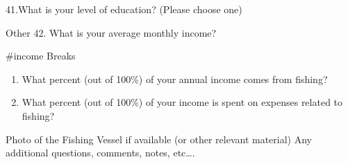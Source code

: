 \documentclass[]{article}
\begin{document}
41.What is your level of education? (Please choose one)

Other 42. What is your average monthly income?

\#income Breaks

\begin{enumerate}
\def\labelenumi{\arabic{enumi}.}
\setcounter{enumi}{42}
\item
  What percent (out of 100\%) of your annual income comes from fishing?
\item
  What percent (out of 100\%) of your income is spent on expenses
  related to fishing?
\end{enumerate}

Photo of the Fishing Vessel if available (or other relevant material)
Any additional questions, comments, notes, etc\ldots{}.
\end{document}
